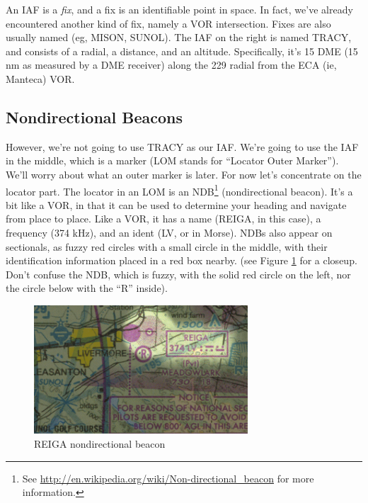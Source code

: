 
An IAF is a \emph{fix}, and a fix is an identifiable point in space.
In fact, we've already encountered another kind of fix, namely a VOR
intersection.  Fixes are also usually named (eg, MISON, SUNOL).  The
IAF on the right is named TRACY, and consists of a radial, a distance,
and an altitude.  Specifically, it's 15 DME (15 nm as measured by a
DME receiver) along the 229 radial from the ECA (ie, Manteca) VOR.



\subsection{Nondirectional Beacons}

However, we're not going to use TRACY as our IAF.  We're going to use
the IAF in the middle, which is a marker (LOM stands for ``Locator
Outer Marker'').  We'll worry about what an outer marker is later.
For now let's concentrate on the locator part.  The locator in an LOM
is an NDB\footnote{See
  \url{http://en.wikipedia.org/wiki/Non-directional_beacon} for more
  information.} (nondirectional beacon).  It's a bit like a VOR, in
that it can be used to determine your heading and navigate from place
to place.  Like a VOR, it has a name (REIGA, in this case), a
frequency (374 kHz), and an ident (LV, or
{\mdot\mdash\mdot\mdot\mspace \mdot\mdot\mdot\mdash} in Morse).  NDBs
also appear on sectionals, as fuzzy red circles with a small circle in
the middle, with their identification information placed in a red box
nearby. (see Figure \ref{fig:NDB} for a closeup.  Don't confuse the
NDB, which is fuzzy, with the solid red circle on the left, nor the
circle below with the ``R'' inside).


\begin{figure}
  \begin{center}
    \includegraphics[width=8cm]{img/NDB}
    \caption{REIGA nondirectional beacon}
    \label{fig:NDB}
  \end{center}
\end{figure}

